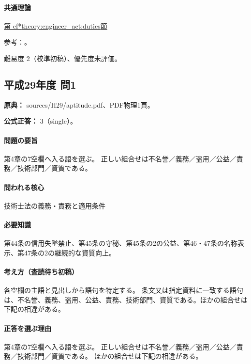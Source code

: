 \paragraph{共通理論} \hyperref[theory:engineer_act:duties]{第
ef*{theory:engineer_act:duties}節}

\par 参考：\cite{engineer_act_current}。

\par 難易度 2（校準初稿）、優先度未評価。

\subsection{平成29年度 問1}
\label{q:h29-reg-apt-01}

\noindent\textbf{原典：} sources/H29/aptitude.pdf、PDF物理1頁。

\textbf{公式正答：} 3（single）。

\paragraph{問題の要旨} 第4章の7空欄へ入る語を選ぶ。 正しい組合せは不名誉／義務／盗用／公益／責務／技術部門／資質である。

\paragraph{問われる核心} 技術士法の義務・責務と適用条件

\paragraph{必要知識} 第44条の信用失墜禁止、第45条の守秘、第45条の2の公益、第46・47条の名称表示、第47条の2の継続的な資質向上。

\paragraph{考え方（査読待ち初稿）} 各空欄の主語と見出しから語句を特定する。 条文又は指定資料に一致する語句は、不名誉、義務、盗用、公益、責務、技術部門、資質である。ほかの組合せは下記の相違がある。

\paragraph{正答を選ぶ理由} 第4章の7空欄へ入る語を選ぶ。 正しい組合せは不名誉／義務／盗用／公益／責務／技術部門／資質である。 ほかの組合せは下記の相違がある。


